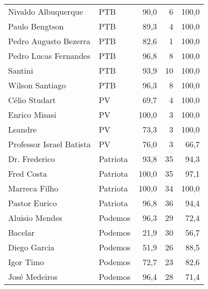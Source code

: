 \begin{longtable}{llrrr}
                 Nivaldo Albuquerque &            PTB &      90,0 &            6 &      100,0 \\
                      Paulo Bengtson &            PTB &      89,3 &            4 &      100,0 \\
               Pedro Augusto Bezerra &            PTB &      82,6 &            1 &      100,0 \\
               Pedro Lucas Fernandes &            PTB &      96,8 &            8 &      100,0 \\
                             Santini &            PTB &      93,9 &           10 &      100,0 \\
                     Wilson Santiago &            PTB &      96,3 &            8 &      100,0 \\
                       Célio Studart &             PV &      69,7 &            4 &      100,0 \\
                       Enrico Misasi &             PV &     100,0 &            3 &      100,0 \\
                             Leandre &             PV &      73,3 &            3 &      100,0 \\
            Professor Israel Batista &             PV &      76,0 &            3 &       66,7 \\
                       Dr. Frederico &       Patriota &      93,8 &           35 &       94,3 \\
                          Fred Costa &       Patriota &     100,0 &           35 &       97,1 \\
                       Marreca Filho &       Patriota &     100,0 &           34 &      100,0 \\
                       Pastor Eurico &       Patriota &      96,8 &           36 &       94,4 \\
                      Aluisio Mendes &        Podemos &      96,3 &           29 &       72,4 \\
                             Bacelar &        Podemos &      21,9 &           30 &       56,7 \\
                        Diego Garcia &        Podemos &      51,9 &           26 &       88,5 \\
                           Igor Timo &        Podemos &      72,7 &           23 &       82,6 \\
                       José Medeiros &        Podemos &      96,4 &           28 &       71,4 \\

\end{longtable}
